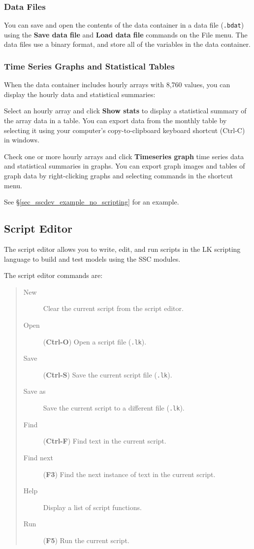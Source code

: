 \documentclass{article}
\begin{document}
\subsubsection{Data Files}
\label{sec_data_files}

You can save and open the contents of the data container in a data file (\texttt{.bdat}) using the \textbf{Save data file} and \textbf{Load data file} commands on the File menu. The data files use a binary format, and store all of the variables in the data container.

\subsubsection{Time Series Graphs and Statistical Tables}
\label{sec_timeseries_statistical}

When the data container includes hourly arrays with 8,760 values, you can display the hourly data and statistical summaries:

Select an hourly array and click \textbf{Show stats} to display a statistical summary of the array data in a table. You can export data from the monthly table by selecting it using your computer's copy-to-clipboard keyboard shortcut (Ctrl-C) in windows.

Check one or more hourly arrays and click \textbf{Timeseries graph} time series data and statistical summaries in graphs. You can export graph images and tables of graph data by right-clicking graphs and selecting commands in the shortcut menu.


See \S\ref{sec_sscdev_example_no_scripting} for an example.

\subsection{Script Editor}
\label{sec_script_editor}

The script editor allows you to write, edit, and run scripts in the LK scripting language to build and test models using the SSC modules.

The script editor commands are:

\begin{quote}
\begin{description}
\item[New] Clear the current script from the script editor.
\item[Open]  (\textbf{Ctrl-O}) Open a script file (\texttt{.lk}).
\item[Save] (\textbf{Ctrl-S}) Save the current script file (\texttt{.lk}).
\item[Save as] Save the current script to a different file (\texttt{.lk}).
\item[Find] (\textbf{Ctrl-F}) Find text in the current script.
\item[Find next] (\textbf{F3}) Find the next instance of text in the current script.
\item[Help] Display a list of script functions.
\item[Run] (\textbf{F5}) Run the current script.
\end{description}
\end{quote}
\end{document}
